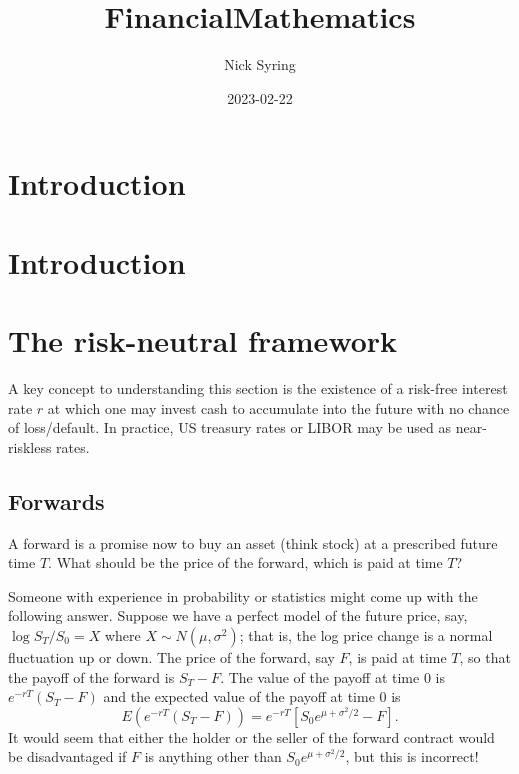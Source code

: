 \documentclass[
]{book}
\title{FinancialMathematics}
\author{Nick Syring}
\date{2023-02-22}
\begin{document}
\maketitle

{
\setcounter{tocdepth}{1}
\tableofcontents
}
\hypertarget{introduction}{%
\chapter{Introduction}\label{introduction}}

\hypertarget{intro}{%
\chapter{Introduction}\label{intro}}

\hypertarget{the-risk-neutral-framework}{%
\chapter{The risk-neutral framework}\label{the-risk-neutral-framework}}

A key concept to understanding this section is the existence of a risk-free interest rate \(r\) at which one may invest cash to accumulate into the future with no chance of loss/default. In practice, US treasury rates or LIBOR may be used as near-riskless rates.

\hypertarget{forwards}{%
\section{Forwards}\label{forwards}}

A forward is a promise now to buy an asset (think stock) at a prescribed future time \(T\). What should be the price of the forward, which is paid at time \(T\)?

Someone with experience in probability or statistics might come up with the following answer. Suppose we have a perfect model of the future price, say, \(\log S_T/S_0 = X\) where \(X\sim N(\mu, \sigma^2)\); that is, the log price change is a normal fluctuation up or down. The price of the forward, say \(F\), is paid at time \(T\), so that the payoff of the forward is \(S_T - F\). The value of the payoff at time \(0\) is \(e^{-rT}(S_T - F)\) and the expected value of the payoff at time \(0\) is
\[E(e^{-rT}(S_T - F)) = e^{-rT}\left[S_0e^{\mu + \sigma^2/2}-F\right].\]
It would seem that either the holder or the seller of the forward contract would be disadvantaged if \(F\) is anything other than \(S_0e^{\mu + \sigma^2/2}\), but this is incorrect!
\end{document}
